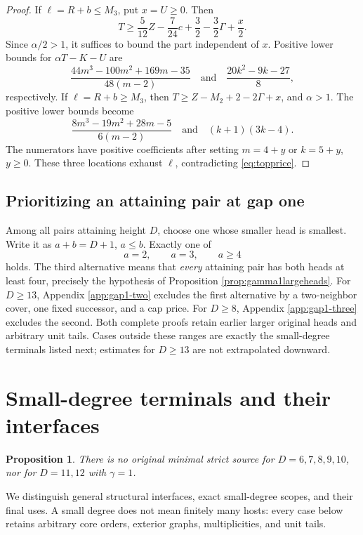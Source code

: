 \documentclass[11pt,a4paper]{article}
\newtheorem{proposition}[theorem]{Proposition}
\theoremstyle{definition}
\begin{document}
\begin{proof}
If $\ell=R+b\le M_3$, put $x=U\ge0$. Then
\[
T\ge\frac5{12}Z-\frac7{24}c+\frac32-\frac32\Gamma+\frac x2.
\]
Since $\alpha/2>1$, it suffices to bound the part independent of $x$. Positive lower bounds for $\alpha T-K-U$ are
\[
\frac{44m^3-100m^2+169m-35}{48(m-2)}
\quad\text{and}\quad
\frac{20k^2-9k-27}{8},
\]
respectively.
If $\ell=R+b\ge M_3$, then
$T\ge Z-M_2+2-2\Gamma+x$, and $\alpha>1$. The positive lower bounds become
\[
\frac{8m^3-19m^2+28m-5}{6(m-2)}
\quad\text{and}\quad (k+1)(3k-4).
\]
The numerators have positive coefficients after setting $m=4+y$ or $k=5+y$, $y\ge0$. These three locations exhaust $\ell$, contradicting \eqref{eq:topprice}.
\end{proof}

\subsection{Prioritizing an attaining pair at gap one}
Among all pairs attaining height $D$, choose one whose smaller head is smallest. Write it as $a+b=D+1$, $a\le b$. Exactly one of
\[
a=2,\qquad a=3,\qquad a\ge4
\]
holds. The third alternative means that \emph{every} attaining pair has both heads at least four, precisely the hypothesis of Proposition \ref{prop:gamma1largeheads}. For $D\ge13$, Appendix \ref{app:gap1-two} excludes the first alternative by a two-neighbor cover, one fixed successor, and a cap price. For $D\ge8$, Appendix \ref{app:gap1-three} excludes the second. Both complete proofs retain earlier larger original heads and arbitrary unit tails. Cases outside these ranges are exactly the small-degree terminals listed next; estimates for $D\ge13$ are not extrapolated downward.


\section{Small-degree terminals and their interfaces}\label{sec:terminals}
\begin{proposition}\label{prop:small}
There is no original minimal strict source for $D=6,7,8,9,10$, nor for $D=11,12$ with $\gamma=1$.
\end{proposition}
We distinguish general structural interfaces, exact small-degree scopes, and their final uses. A small degree does not mean finitely many hosts: every case below retains arbitrary core orders, exterior graphs, multiplicities, and unit tails.
\end{document}
